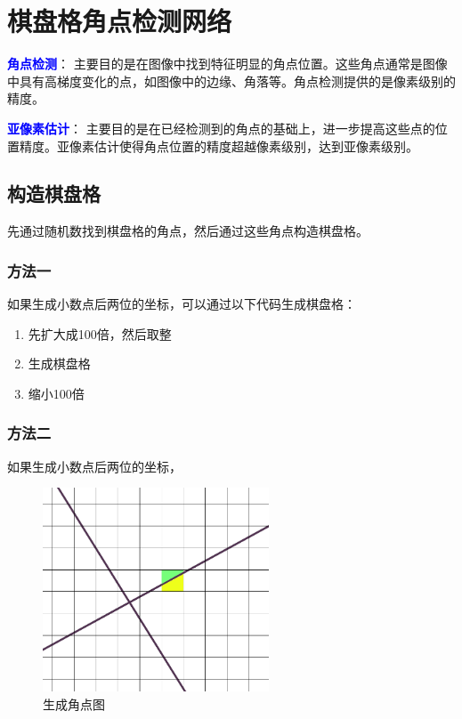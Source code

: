 \documentclass{lzureport}
\begin{document}
\newpage
\section{棋盘格角点检测网络}
\textcolor{blue}{\textbf{角点检测}}： 主要目的是在图像中找到特征明显的角点位置。这些角点通常是图像中具有高梯度变化的点，如图像中的边缘、角落等。角点检测提供的是像素级别的精度。

\textcolor{blue}{\textbf{亚像素估计}}： 主要目的是在已经检测到的角点的基础上，进一步提高这些点的位置精度。亚像素估计使得角点位置的精度超越像素级别，达到亚像素级别。

\subsection{构造棋盘格}
先通过随机数找到棋盘格的角点，然后通过这些角点构造棋盘格。

\subsubsection{方法一}
如果生成小数点后两位的坐标，可以通过以下代码生成棋盘格：
\begin{enumerate}[itemindent=1em,label=\arabic*)]
	\item 先扩大成100倍，然后取整
	\item 生成棋盘格
	\item 缩小100倍
\end{enumerate}

\subsubsection{方法二}
如果生成小数点后两位的坐标，
\begin{figure}[htpb]
	\centering
	\includegraphics[width=0.6\textwidth]{figure/生成角点图.png}
	\caption{生成角点图}
	\label{fig:生成角点图}
\end{figure}
\end{document}
